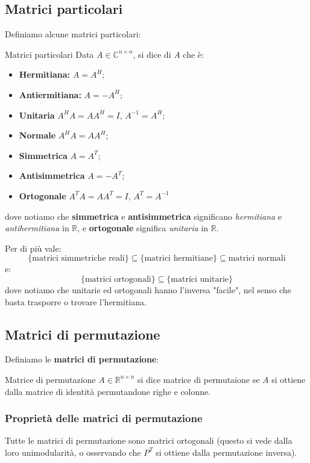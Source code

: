 \documentclass[a4paper,11pt]{article}
\begin{document}
\subsection{Matrici particolari}
Definiamo alcune matrici particolari:
\begin{definition}{Matrici particolari}
	Data $A \in \mathbb{C}^{n \times n}$, si dice di $A$ che è:
	\begin{itemize}
		\item \textbf{Hermitiana:} $A = A^H$; 
		\item \textbf{Antiermitiana:} $A = -A^H$;
		\item \textbf{Unitaria} $A^H A = A A^H = I$, $A^{-1} = A^H$;
		\item \textbf{Normale} $A^H A = A A^H$;
		\item \textbf{Simmetrica} $A = A^T$;
		\item \textbf{Antisimmetrica} $A = -A^T$;
		\item \textbf{Ortogonale} $A^TA = AA^T = I$, $A^T = A^{-1}$
	\end{itemize}
\end{definition}
dove notiamo che \textbf{simmetrica} e \textbf{antisimmetrica} significano \textit{hermitiana} e \textit{antihermitiana} in $\mathbb{R}$, e \textbf{ortogonale} significa \textit{unitaria} in $\mathbb{R}$.

Per di più vale:
$$
\{ \text{matrici simmetriche reali} \} \subseteq \{ \text{matrici hermitiane} \} \subseteq \text{matrici normali}
$$
e:
$$\{ \text{matrici ortogonali} \} \subseteq \{ \text{matrici unitarie} \}
$$
dove notiamo che unitarie ed ortogonali hanno l'inversa "facile", nel senso che basta trasporre o trovare l'hermitiana.

\subsection{Matrici di permutazione}
Definiamo le \textbf{matrici di permutazione}:
\begin{definition}{Matrice di permutazione}
	$A \in \mathbb{R}^{n \times n}$ si dice matrice di permutaione se $A$ si ottiene dalla matrice di identità permutandone righe e colonne.
\end{definition}

\subsubsection{Proprietà delle matrici di permutazione}
Tutte le matrici di permutazione sono matrici ortogonali (questo si vede dalla loro unimodularità, o osservando che $P^T$ si ottiene dalla permutazione inversa).
\end{document}
